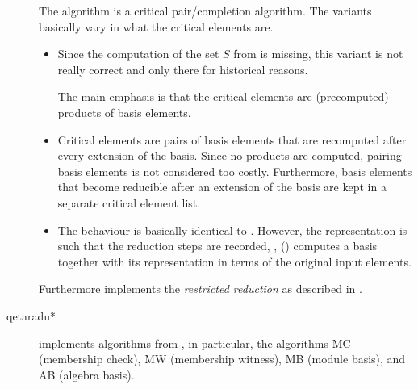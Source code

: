 \documentclass{article}
\begin{document}
\begin{description}
  The algorithm \algoSamba{} is a critical pair/completion algorithm.
  The variants basically vary in what the critical elements are.
  \begin{itemize}
  \item {} Since the computation of the set $S$
    from \cite{Hemmecke:DancingSambaRamanujan:2018} is missing, this
    variant is not really correct and only there for historical
    reasons.

    The main emphasis is that the critical elements are (precomputed)
    products of basis elements.
  \item {} Critical elements are pairs of basis
    elements that are recomputed after every extension of the basis.
    Since no products are computed, pairing basis elements is not
    considered too costly. Furthermore, basis elements that become
    reducible after an extension of the basis are kept in a separate
    critical element list.
  \item {} The behaviour is basically identical
    to . However, the representation is such
    that the reduction steps are recorded, \ie,
     (\algoSamba) computes a basis together with
    its representation in terms of the original input elements.
  \end{itemize}
  Furthermore  implements the \emph{restricted
    reduction} as described in
  \cite{Hemmecke:DancingSambaRamanujan:2018}.

\item[qetaradu*] implements algorithms from
  \cite{Radu:RamanujanKolberg:2015}, in particular, the algorithms MC
  (membership check), MW (membership witness), MB (module basis), and
  AB (algebra basis).


\end{description}
\end{document}
